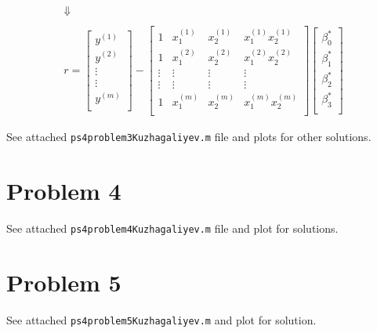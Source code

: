 \documentclass[10pt,letter]{article}
\begin{document}
\begin{gather*}
\Downarrow
\\\\
r =  
\left[ {\begin{array}{c}
y^{(1)} \\
y^{(2)} \\
\vdots \\
\vdots \\
y^{(m)} \\
\end{array} } \right]
-
\left[ {\begin{array}{cccc}
 1 & x_1^{(1)} & x_2^{(1)} & x_1^{(1)} x_2^{(1)} \\
 1 & x_1^{(2)} & x_2^{(2)} & x_1^{(2)} x_2^{(2)} \\
 \vdots & \vdots & \vdots & \vdots \\
 \vdots & \vdots & \vdots & \vdots \\
 1 & x_1^{(m)} & x_2^{(m)} & x_1^{(m)} x_2^{(m)} \\
\end{array} } \right]
\left[ {\begin{array}{c}
\beta^*_0 \\
\beta^*_1 \\
\beta^*_2 \\
\beta^*_3 \\
\end{array} } \right]
\end{gather*}

See attached \texttt{ps4problem3Kuzhagaliyev.m} file and plots for other solutions.

\section*{Problem 4}

See attached \texttt{ps4problem4Kuzhagaliyev.m} file and plot for solutions.

\section*{Problem 5}

See attached \texttt{ps4problem5Kuzhagaliyev.m} and plot for solution.
\end{document}
